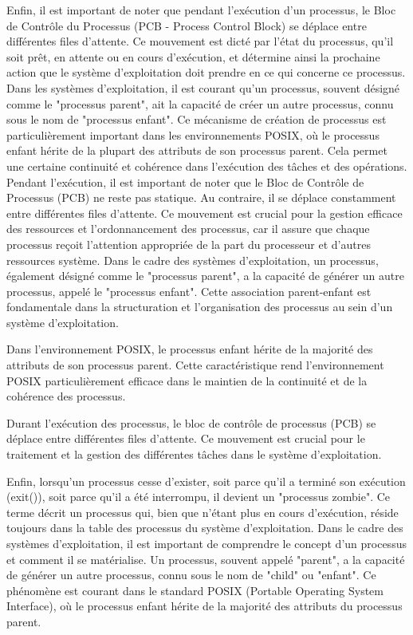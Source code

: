 \documentclass[12pt]{article}
\begin{document}
Enfin, il est important de noter que pendant l'exécution d'un processus, le Bloc de Contrôle du Processus (PCB - Process Control Block) se déplace entre différentes files d'attente. Ce mouvement est dicté par l'état du processus, qu'il soit prêt, en attente ou en cours d'exécution, et détermine ainsi la prochaine action que le système d'exploitation doit prendre en ce qui concerne ce processus.
Dans les systèmes d'exploitation, il est courant qu'un processus, souvent désigné comme le "processus parent", ait la capacité de créer un autre processus, connu sous le nom de "processus enfant". Ce mécanisme de création de processus est particulièrement important dans les environnements POSIX, où le processus enfant hérite de la plupart des attributs de son processus parent. Cela permet une certaine continuité et cohérence dans l'exécution des tâches et des opérations. Pendant l'exécution, il est important de noter que le Bloc de Contrôle de Processus (PCB) ne reste pas statique. Au contraire, il se déplace constamment entre différentes files d'attente. Ce mouvement est crucial pour la gestion efficace des ressources et l'ordonnancement des processus, car il assure que chaque processus reçoit l'attention appropriée de la part du processeur et d'autres ressources système.
Dans le cadre des systèmes d'exploitation, un processus, également désigné comme le "processus parent", a la capacité de générer un autre processus, appelé le "processus enfant". Cette association parent-enfant est fondamentale dans la structuration et l'organisation des processus au sein d'un système d'exploitation.

Dans l'environnement POSIX, le processus enfant hérite de la majorité des attributs de son processus parent. Cette caractéristique rend l'environnement POSIX particulièrement efficace dans le maintien de la continuité et de la cohérence des processus.

Durant l'exécution des processus, le bloc de contrôle de processus (PCB) se déplace entre différentes files d'attente. Ce mouvement est crucial pour le traitement et la gestion des différentes tâches dans le système d'exploitation.

Enfin, lorsqu'un processus cesse d'exister, soit parce qu'il a terminé son exécution (exit()), soit parce qu'il a été interrompu, il devient un "processus zombie". Ce terme décrit un processus qui, bien que n'étant plus en cours d'exécution, réside toujours dans la table des processus du système d'exploitation.
Dans le cadre des systèmes d'exploitation, il est important de comprendre le concept d'un processus et comment il se matérialise. Un processus, souvent appelé "parent", a la capacité de générer un autre processus, connu sous le nom de "child" ou "enfant". Ce phénomène est courant dans le standard POSIX (Portable Operating System Interface), où le processus enfant hérite de la majorité des attributs du processus parent.
\end{document}

